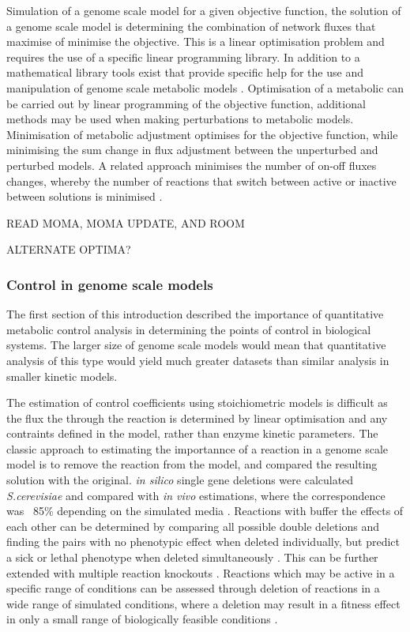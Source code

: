 Simulation of a genome scale model for a given objective function, the solution of a genome scale model is determining the combination of network fluxes that maximise of minimise the objective. This is a linear optimisation problem and requires the use of a specific linear programming library. In addition to a mathematical library tools exist that provide specific help for the use and manipulation of genome scale metabolic models \cite{becker2007}. Optimisation of a metabolic can be carried out by linear programming of the objective function, additional methods may be used when making perturbations to metabolic models. Minimisation of metabolic adjustment \cite{segre2002,burgard2003} optimises for the objective function, while minimising the sum change in flux adjustment between the unperturbed and perturbed models. A related approach minimises the number of on-off fluxes changes, whereby the number of reactions that switch between active or inactive between solutions is minimised \cite{schlomi2005}.

READ MOMA, MOMA UPDATE, AND ROOM

ALTERNATE OPTIMA?

\subsubsection{Control in genome scale models}

The first section of this introduction described the importance of quantitative metabolic control analysis in determining the points of control in biological systems. The larger size of genome scale models would mean that quantitative analysis of this type would yield much greater datasets than similar analysis in smaller kinetic models.

The estimation of control coefficients using stoichiometric models is difficult as the flux the through the reaction is determined by linear optimisation and any contraints defined in the model, rather than enzyme kinetic parameters. The classic approach to estimating the importannce of a reaction in a genome scale model is to remove the reaction from the model, and compared the resulting solution with the original. \emph{in silico} single gene deletions were calculated \emph{S.cerevisiae} and compared with \emph{in vivo} estimations, where the correspondence was ~85\% depending on the simulated media \cite{famili2003,forster2003}. Reactions with buffer the effects of each other can be determined by comparing all possible double deletions and finding the pairs with no phenotypic effect when deleted individually, but predict a sick or lethal phenotype when deleted simultaneously \cite{harrison2007}. This can be further extended with multiple reaction knockouts \cite{deutscher2008}. Reactions which may be active in a specific range of conditions can be assessed through deletion of reactions in a wide range of simulated conditions, where a deletion may result in a fitness effect in only a small range of biologically feasible conditions \cite{papp2004}.

